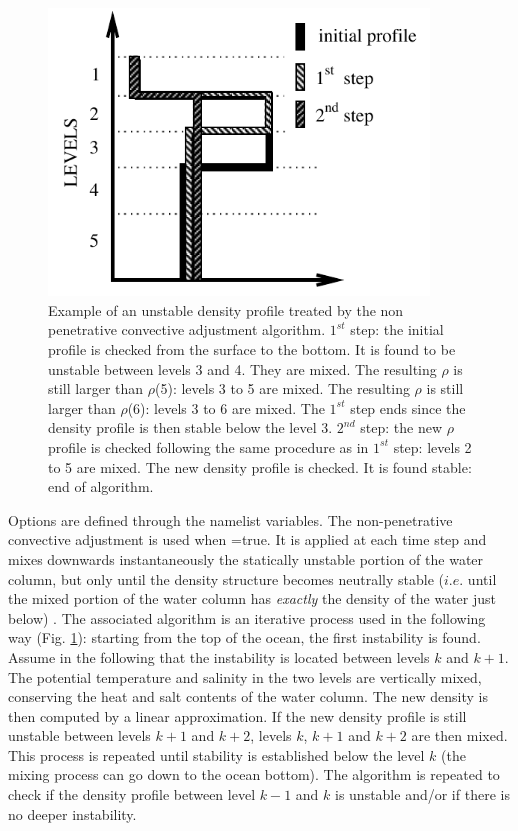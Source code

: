 \begin{figure}[!htb]  	\begin{center}
\includegraphics[width=0.90\textwidth]{./TexFiles/Figures/Fig_npc.pdf}
\caption{  \label{Fig_npc} 
Example of an unstable density profile treated by the non penetrative 
convective adjustment algorithm. $1^{st}$ step: the initial profile is checked from 
the surface to the bottom. It is found to be unstable between levels 3 and 4. 
They are mixed. The resulting $\rho$ is still larger than $\rho$(5): levels 3 to 5 
are mixed. The resulting $\rho$ is still larger than $\rho$(6): levels 3 to 6 are 
mixed. The $1^{st}$ step ends since the density profile is then stable below 
the level 3. $2^{nd}$ step: the new $\rho$ profile is checked following the same 
procedure as in $1^{st}$ step: levels 2 to 5 are mixed. The new density profile 
is checked. It is found stable: end of algorithm.}
\end{center}  	\end{figure}

Options are defined through the   namelist variables.
The non-penetrative convective adjustment is used when =true. 
It is applied at each  time step and mixes downwards instantaneously 
the statically unstable portion of the water column, but only until the density 
structure becomes neutrally stable ($i.e.$ until the mixed portion of the water 
column has \textit{exactly} the density of the water just below) \citep{Madec_al_JPO91}. 
The associated algorithm is an iterative process used in the following way 
(Fig. \ref{Fig_npc}): starting from the top of the ocean, the first instability is 
found. Assume in the following that the instability is located between levels 
$k$ and $k+1$. The potential temperature and salinity in the two levels are 
vertically mixed, conserving the heat and salt contents of the water column. 
The new density is then computed by a linear approximation. If the new 
density profile is still unstable between levels $k+1$ and $k+2$, levels $k$, 
$k+1$ and $k+2$ are then mixed. This process is repeated until stability is 
established below the level $k$ (the mixing process can go down to the 
ocean bottom). The algorithm is repeated to check if the density profile 
between level $k-1$ and $k$ is unstable and/or if there is no deeper instability.

